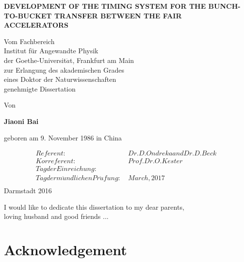 \documentclass[12pt,twoside]{report}
\begin{document}
\begin{center}
\thispagestyle{empty}

    \vspace{6cm}
	 \LARGE \textbf{\uppercase{Development of the timing system for the Bunch-to-Bucket transfer between the FAIR accelerators }}
	 \vspace{2cm}

	{ \normalsize Vom Fachbereich\\
	Institut für Angewandte Physik\\
	der Goethe-Universit$\ddot{a}$t, Frankfurt am Main\\
	zur Erlangung des akademischen Grades\\
	eines Doktor der Naturwissenschaften\\
	genehmigte Dissertation\par}
    \vspace{2cm}
    {\normalsize Von \par}
    \LARGE \textbf{ Jiaoni Bai}\\
    {\normalsize geboren am 9. November 1986 in China \par}
    \vspace{2cm}
	\normalsize
	\begin{align*}
		 Referent:\: &Dr. D.Ondreka and Dr. D.Beck \\
		 Korreferent:\: &Prof. Dr. O.Kester\\
		 Tag der Einreichung:\: &\\
		 Tag der m\ddot{u}ndlichen Pr\ddot{u}fung:\: & March, 2017\\
\end{align*}
    \vspace{2cm}
    {\normalsize Darmstadt 2016}
\end{center}

\renewcommand{\labelitemii}{$\bullet$}

\clearpage
\vspace*{\fill}
\begin{center}
\begin{minipage}{.8\textwidth}
I would like to dedicate this dissertation to my dear parents,\\ loving husband and good friends ...
\end{minipage}
\end{center}
\vfill %
\clearpage

\chapter*{Acknowledgement}

\end{document}
